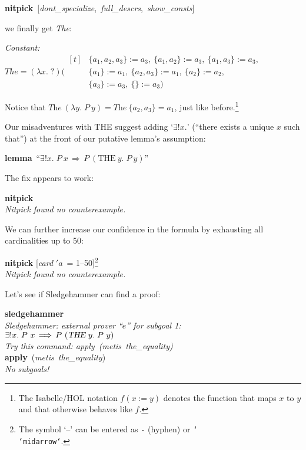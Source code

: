 \documentclass[a4paper,12pt]{article}
\def\unk{{?}}
\def\undef{(\lambda x.\; \unk)}
\begin{document}
\prew
\textbf{nitpick}~[\textit{dont\_specialize},\, \textit{full\_descrs},\,
\textit{show\_consts}]
\postw

we finally get \textit{The}:

\prew
\slshape Constant: \nopagebreak \\
\hbox{}\qquad $\mathit{The} = \undef{}
    (\!\begin{aligned}[t]%
    & \{a_1, a_2, a_3\} := a_3,\> \{a_1, a_2\} := a_3,\> \{a_1, a_3\} := a_3, \\[-2pt] %
    & \{a_1\} := a_1,\> \{a_2, a_3\} := a_1,\> \{a_2\} := a_2, \\[-2pt]
    & \{a_3\} := a_3,\> \{\} := a_3)\end{aligned}$
\postw

Notice that $\textit{The}~(\lambda y.\;P~y) = \textit{The}~\{a_2, a_3\} = a_1$,
just like before.\footnote{The Isabelle/HOL notation $f(x :=
y)$ denotes the function that maps $x$ to $y$ and that otherwise behaves like
$f$.}

Our misadventures with THE suggest adding `$\exists!x{.}$' (``there exists a
unique $x$ such that'') at the front of our putative lemma's assumption:

\prew
\textbf{lemma}~``$\exists {!}x.\; P~x\,\Longrightarrow\, P~(\textrm{THE}~y.\;P~y)$''
\postw

The fix appears to work:

\prew
\textbf{nitpick} \\[2\smallskipamount]
\slshape Nitpick found no counterexample.
\postw

We can further increase our confidence in the formula by exhausting all
cardinalities up to 50:

\prew
\textbf{nitpick} [\textit{card} $'a$~= 1--50]\footnote{The symbol `--'
can be entered as \texttt{-} (hyphen) or
\texttt{\char`\\\char`\<midarrow\char`\>}.} \\[2\smallskipamount]
\slshape Nitpick found no counterexample.
\postw

Let's see if Sledgehammer can find a proof:

\prew
\textbf{sledgehammer} \\[2\smallskipamount]
{\slshape Sledgehammer: external prover ``$e$'' for subgoal 1: \\
$\exists{!}x.\; P~x\,\Longrightarrow\, P~(\hbox{\slshape THE}~y.\; P~y)$ \\
Try this command: \textrm{apply}~(\textit{metis~the\_equality})} \\[2\smallskipamount]
\textbf{apply}~(\textit{metis~the\_equality\/}) \nopagebreak \\[2\smallskipamount]
{\slshape No subgoals!}%
\postw
\end{document}
